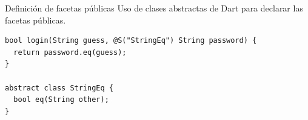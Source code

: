 \documentclass[aspectratio=169,10pt]{beamer}
\begin{document}
\begin{frame}[fragile]{Definición de facetas públicas}
	Uso de clases abstractas de Dart para declarar las facetas públicas. \\ \pause
	\vspace{1cm}
\begin{lstlisting}[escapechar=?,basicstyle=\fontsize{9}{9}\ttfamily]
bool login(String guess, @S("StringEq") String password) {
  return password.eq(guess);
}

abstract class StringEq {
  bool eq(String other);
}
\end{lstlisting}
\end{frame}
%
%
%
\end{document}

